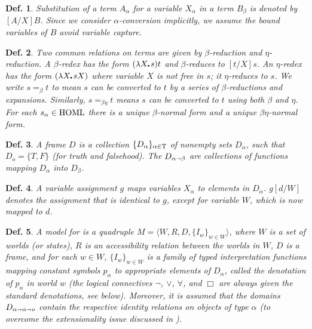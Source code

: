 \documentclass{ecai2014}
\newtheorem{definition}{Def.}
\def\lambdot{\rule{0.6mm}{0.6mm}\hspace{0.4ex}}
\def\lam#1{\lambda #1\lambdot}
\def\Metaeq{=}
\def\Bnormform#1{\left.{#1}\hspace*{-.4ex}\right\downarrow_\beta}
\def\Benormform#1{\left.{#1}\hspace*{-.4ex}\right\downarrow_{\beta\eta}}
\def\eqb{\Metaeq_{\beta}}
\def\eqbe{\Metaeq_{\beta\eta}}
\newcommand\entity[1]{\text{\textrm{#1}}}
\def\stt{\entity{STT}\xspace}
\def\HOML{\entity{HOML}\xspace}
\def\ar{\shortrightarrow}
\begin{document}
\begin{definition}\label{homlsubstitution}
  \emph{Substitution} of a term $A_\alpha$ for a variable $X_\alpha$
  in a term $B_\beta$ is denoted by $[A/X]B$.  Since we consider
  $\alpha$-conversion implicitly, we assume the bound variables of $B$
  avoid variable capture.
\end{definition}

\begin{definition}\label{homlbetaeta} %
  Two common relations on terms are given by $\beta$-reduction and
  $\eta$-reduction.  A $\beta$-redex has the form $(\lam{X}s)t$ and
  $\beta$-reduces to $[t/X]s$.  An $\eta$-redex has the form
  $(\lam{X}s X)$ where variable $X$ is not free in $s$; it
  $\eta$-reduces to $s$.  We write $s\eqb t$ to mean $s$ can be
  converted to $t$ by a series of $\beta$-reductions and expansions.
  Similarly, $s\eqbe t$ means $s$ can be converted to $t$ using both
  $\beta$ and $\eta$.  For each $s_\alpha\in \HOML$ there is a unique
  \emph{$\beta$-normal form} and a unique \emph{$\beta\eta$-normal
    form}.
\end{definition}


\begin{definition}\label{homlframe}
A \emph{frame} $D$ is a collection $\{D_\alpha\}_{\alpha\in\entity{T}}$
of nonempty sets $D_\alpha$, such that $D_o = \{T,F\}$
(for truth and falsehood).  The
$D_{\alpha\ar\beta}$ are collections of functions mapping
$D_\alpha$ into $D_\beta$. 
\end{definition}


\begin{definition}\label{homlassignment}
A \emph{variable assignment} $g$ maps
variables $X_\alpha$ to elements in $D_\alpha$. $g[d/W]$ denotes the
assignment that is identical to $g$, except for variable $W$, which is
now mapped to $d$.
\end{definition}

\begin{definition}\label{homlmodel}
  A \emph{model} for \HOML is a quadruple $M=\langle W, R, D,
  \{I_w\}_{w\in W} \rangle$, where $W$ is a set of worlds (or states),
  $R$ is an accessibility relation between the worlds in $W$, $D$ is a
  frame, and for each $w\in W$, $\{I_w\}_{w\in W}$ is a family of
  typed interpretation functions mapping constant symbols $p_\alpha$
  to appropriate elements of $D_\alpha$, called the \emph{denotation
    of $p_\alpha$ in world $w$} (the logical connectives $\neg$,
  $\vee$, $\forall$, and $\Box$ are always given the standard
  denotations, see below).  Moreover, it is assumed that the domains
  $D_{\alpha\ar\alpha\ar o}$ contain the respective identity relations
  on objects of type $\alpha$ (to overcome the extensionality
  issue discussed in \cite{Andrews:gmae72}).
\end{definition}
\end{document}
